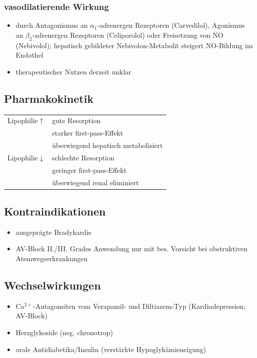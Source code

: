 \documentclass[10pt,a4paper]{report}
\begin{document}
\subsubsection{vasodilatierende Wirkung}
\begin{itemize}
	\item durch Antagonismus an $\alpha_1$-adrenergen Rezeptoren (Carvedilol), Agonismus an $\beta_2$-adrenergen Rezeptoren (Celiporolol) oder Freisetzung von NO (Nebivolol); hepatisch gebildeter Nebivolon-Metabolit steigert NO-Bildung im Endothel
	\item therapeutischer Nutzen derzeit unklar
\end{itemize}
\subsection{Pharmakokinetik}
\begin{tabularx}{\textwidth}{XX}
Lipophilie$\uparrow$&gute Resorption\\
&starker first-pass-Effekt\\
&überwiegend hepatisch metabolisiert\\
Lipophilie$\downarrow$&schlechte Resorption\\
&geringer first-pass-Effekt\\
&überwiegend renal eliminiert\\
\end{tabularx}
\subsection{Kontraindikationen}
\begin{itemize}
	\item ausgeprägte Bradykardie
	\item AV-Block II./III. Grades Anwendung nur mit bes. Vorsicht bei obstruktiven Atemwegserkrankungen
\end{itemize}
\subsection{Wechselwirkungen}
\begin{itemize}
	\item Ca$^{2+}$-Antagonsiten vom Verapamil- und Diltiazem-Typ (Kardiodepression; AV-Block)
	\item Herzglykoside (neg. chronotrop)
	\item orale Antidiabetika/Insulin (verstärkte Hypoglykämieneigung)
\end{itemize}
\end{document}
